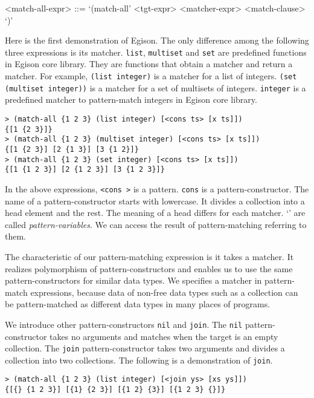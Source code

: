 \documentclass{article}
\begin{document}
\begin{grammar}
<match-all-expr> ::= `(match-all' <tgt-expr> <matcher-expr> <match-clause> `)'
\end{grammar}

Here is the first demonstration of Egison.
The only difference among the following three expressions is its matcher.
\texttt{list}, \texttt{multiset} and \texttt{set} are predefined functions in Egison core library.
They are functions that obtain a matcher and return a matcher.
For example, \texttt{(list integer)} is a matcher for a list of integers.
\texttt{(set (multiset integer))} is a matcher for a set of multisets of integers.
\texttt{integer} is a predefined matcher to pattern-match integers in Egison core library.

{\footnotesize
\begin{verbatim}
> (match-all {1 2 3} (list integer) [<cons ts> [x ts]])
{[1 {2 3}]}
> (match-all {1 2 3} (multiset integer) [<cons ts> [x ts]])
{[1 {2 3}] [2 {1 3}] [3 {1 2}]}
> (match-all {1 2 3} (set integer) [<cons ts> [x ts]])
{[1 {1 2 3}] [2 {1 2 3}] [3 {1 2 3}]}
\end{verbatim}
}

In the above expressions, \texttt{<cons \ts>} is a pattern.
\texttt{cons} is a pattern-constructor.
The name of a pattern-constructor starts with lowercase.
It divides a collection into a head element and the rest.
The meaning of a head differs for each matcher.
`\texttt{\ts}' are called \textit{pattern-variables}.
We can access the result of pattern-matching referring to them.

The characteristic of our pattern-matching expression is it takes a matcher.
It realizes polymorphism of pattern-constructors and enables us to use the same pattern-constructors for similar data types.
We specifies a matcher in pattern-match expressions, because data of non-free data types such as a collection can be pattern-matched as different data types in many places of programs.

We introduce other pattern-constructors \texttt{nil} and \texttt{join}.
The \texttt{nil} pattern-constructor takes no arguments and matches when the target is an empty collection.
The \texttt{join} pattern-constructor takes two arguments and divides a collection into two collections.
The following is a demonstration of \texttt{join}.

{\footnotesize
\begin{verbatim}
> (match-all {1 2 3} (list integer) [<join ys> [xs ys]])
{[{} {1 2 3}] [{1} {2 3}] [{1 2} {3}] [{1 2 3} {}]}
\end{verbatim}
}
\end{document}
